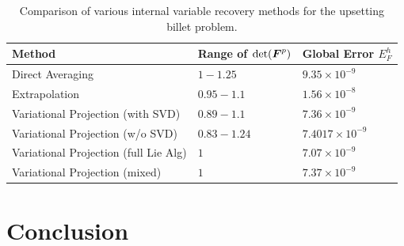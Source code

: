 \documentclass[12pt]{article}
\begin{document}
 \begin{table}[htbp]
  \begin{center}
    \begin{tabular}{ l l l }
      \toprule
      
      Method
      &
      Range of $\det({\boldsymbol{F}}^{p})$
      & 
      Global Error $E_{F}^{h}$
      \\
      \hline
      Direct Averaging
      &
      $1-1.25$
      & 
      $9.35 \times 10^{-9}$
      \\
      Extrapolation   
      &
      $0.95-1.1$
      &
      $1.56 \times 10^{-8}$
      \\
      Variational Projection (with SVD)  
      &
      $0.89-1.1$
      & 
      $7.36 \times 10^{-9}$
      \\
       Variational Projection (w/o SVD)  
      &
      $0.83-1.24$
      & 
      $7.4017 \times 10^{-9}$
      \\
       Variational Projection (full Lie Alg)  
      &
      $1$
      & 
      $7.07 \times 10^{-9}$
      \\
      Variational Projection (mixed)  
      &
      $1$
      & 
      $7.37 \times 10^{-9}$
      \\
      \bottomrule
    \end{tabular}
    \caption{Comparison of various internal variable recovery methods for the upsetting billet problem.}
    \label{tab:BilletErrorComparison}
  \end{center}
\end{table}

\section{Conclusion}



\end{document}
